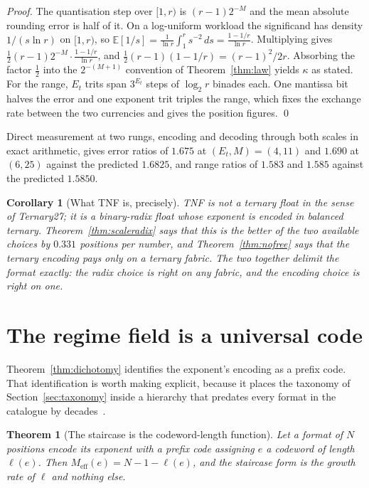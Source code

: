 \documentclass[11pt]{article}
\newtheorem{theorem}{Theorem}
\newtheorem{corollary}{Corollary}
\theoremstyle{definition}
\begin{document}
\begin{proof}
The quantisation step over $[1,r)$ is $(r-1)2^{-M}$ and the mean absolute
rounding error is half of it. On a log-uniform workload the significand has
density $1/(s\ln r)$ on $[1,r)$, so
$\mathbb{E}[1/s] = \frac{1}{\ln r}\int_1^{r} s^{-2}\,ds = \frac{1-1/r}{\ln r}$.
Multiplying gives $\tfrac12 (r-1)2^{-M}\cdot\frac{1-1/r}{\ln r}$, and
$\tfrac12(r-1)(1-1/r) = (r-1)^2/2r$. Absorbing the factor $\tfrac12$ into the
$2^{-(M+1)}$ convention of Theorem~\ref{thm:law} yields $\kappa$ as stated. For
the range, $E_t$ trits span $3^{E_t}$ steps of $\log_2 r$ binades each. One
mantissa bit halves the error and one exponent trit triples the range, which
fixes the exchange rate between the two currencies and gives the position
figures. \qed
\end{proof}

Direct measurement at two rungs, encoding and decoding through both scales in
exact arithmetic, gives error ratios of $1.675$ at $(E_t,M) = (4,11)$ and $1.690$
at $(6,25)$ against the predicted $1.6825$, and range ratios of $1.583$ and
$1.585$ against the predicted $1.5850$.

\begin{corollary}[What TNF is, precisely]
TNF is not a ternary float in the sense of Ternary27; it is a binary-radix float
whose exponent is \emph{encoded} in balanced ternary. Theorem~\ref{thm:scaleradix}
says that this is the better of the two available choices by $0.331$ positions per
number, and Theorem~\ref{thm:nofree} says that the ternary encoding pays only on a
ternary fabric. The two together delimit the format exactly: the radix choice is
right on any fabric, and the encoding choice is right on one.
\end{corollary}


\section{The regime field is a universal code}
\label{sec:codes}

Theorem~\ref{thm:dichotomy} identifies the exponent's encoding as a prefix code.
That identification is worth making explicit, because it places the taxonomy of
Section~\ref{sec:taxonomy} inside a hierarchy that predates every format in the
catalogue by decades~\cite{elias1975}.

\begin{theorem}[The staircase is the codeword-length function]
\label{thm:code}
Let a format of $N$ positions encode its exponent with a prefix code assigning
$e$ a codeword of length $\ell(e)$. Then
$M_{\mathrm{eff}}(e) = N - 1 - \ell(e)$, and the staircase form is the growth
rate of $\ell$ and nothing else.
\end{theorem}
\end{document}

